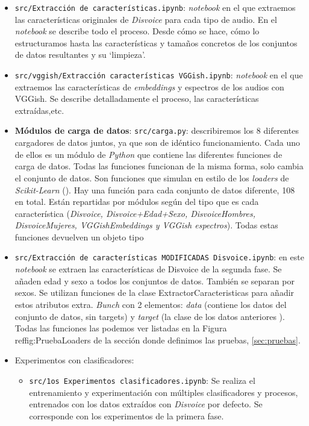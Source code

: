 \begin{itemize}
\item \texttt{src/Extracción de características.ipynb}: \textit{notebook} en el que extraemos las características originales de \textit{Disvoice} para cada tipo de audio. En el \textit{notebook} se describe todo el proceso. Desde cómo se hace, cómo lo estructuramos hasta las características y tamaños concretos de los conjuntos de datos resultantes y su `limpieza'.
\item \texttt{src/vggish/Extracción características VGGish.ipynb}: \textit{notebook} en el que extraemos las características de \textit{embeddings} y espectros de los audios con VGGish. Se describe detalladamente el proceso, las características extraídas,etc.
\item \textbf{Módulos de carga de datos}: \texttt{src/carga\*.py}: describiremos los 8 diferentes cargadores de datos juntos, ya que son de idéntico funcionamiento. Cada uno de ellos es un módulo de \textit{Python} que contiene las diferentes funciones de carga de datos. Todas las funciones funcionan de la misma forma, solo cambia el conjunto de datos. Son funciones que simulan en estilo de los \textit{loaders} de \textit{Scikit-Learn} (). Hay una función para cada conjunto de datos diferente, 108 en total. Están repartidas por módulos según del tipo que es cada característica (\textit{Disvoice, Disvoice+Edad+Sexo, DisvoiceHombres, DisvoiceMujeres, VGGishEmbeddings y VGGish espectros}). Todas estas funciones devuelven un objeto tipo 
\item \texttt{src/Extracción de características MODIFICADAS Disvoice.ipynb}: en este \textit{notebook} se extraen las características de Disvoice de la segunda fase. Se añaden edad y sexo a todos los conjuntos de datos. También se separan por sexos. Se utilizan funciones de la clase ExtractorCaracteristicas para añadir estos atributos extra. 
\textit{Bunch} con 2 elementos: \textit{data} (contiene los datos del conjunto de datos, sin targets) y \textit{target} (la clase de los datos anteriores ). Todas las funciones las podemos ver listadas en la Figura ref{fig:PruebaLoaders} de la sección donde definimos las pruebas, \ref{sec:pruebas}.
\item Experimentos con clasificadores:
\begin{itemize}
\item \texttt{src/1os Experimentos clasificadores.ipynb}: Se realiza el entrenamiento y experimentación con múltiples clasificadores y procesos, entrenados con los datos extraídos con \textit{Disvoice} por defecto. Se corresponde con los experimentos de la primera fase.

\end{itemize}
\end{itemize}

